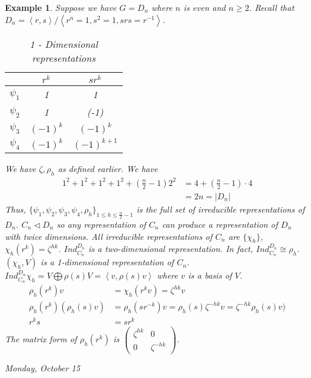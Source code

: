 \documentclass[letterpaper, leqno, 12pt]{article}
\newcommand{\fin}{\qquad \quad \hfill \framebox[1.75mm][l]{\,}}
\providecommand{\ip}[1]{\left\langle #1 \right\rangle}
\newcommand{\tmatrix}[4]{\left(  \begin{array}{cc}
#1 & #2 \\ 
#3 & #4
\end{array} \right) }
\theoremstyle{stdthm}
\theoremstyle{stddef}
\newtheorem{eg}[thm]{Example} %
\theoremstyle{stdnonum}
\theoremstyle{stdqands}
\theoremstyle{stdbold}
\begin{document}
\begin{eg}
Suppose we have $G = D_n$ where $n$ is even and $n\geq 2$. Recall that $D_n = \ip{r,s}/\ip{r^n = 1, s^2 = 1, srs = r^{-1}}$. 

\begin{table}[htdp]
\caption{1 - Dimensional representations}
\begin{center}
\begin{tabular}{|c|c|c|}
 & $r^k$ & $sr^k$ \\ 
 \hline
 $\psi_1$ & 1 & 1 \\
 $\psi_2$ & 1 & (-1) \\
 $\psi_3$ & $(-1)^k$ & $(-1)^k$\\
 $ \psi_4 $ & $(-1)^k$ & $(-1)^{k+1}$ 
\end{tabular}
\end{center}
\label{1 Dimensional representations}
\end{table}
We have $\zeta, \rho_h$ as defined earlier. We have
\begin{align*}
1^2 + 1^2 + 1^2 + 1^2 +(\frac{n}{2} - 1) 2^2 &= 4 + (\frac{n}{2} - 1) \cdot 4\\
&= 2n = |D_n|
\end{align*}
Thus, $\{\psi_1, \psi_2,\psi_3,\psi_4, \rho_h\}_{1\leq h \leq \frac{n}{2} - 1}$ is the full set of irreducible representations of $D_n$.  $C_n \lhd D_n$  so any representation of $C_n$ can produce a representation of $D_n$  with twice dimensions. All irreducible representations of $C_n$ are $\{\chi_h\}$, $\chi_h(r^k) = \zeta^{hk}$. $Ind_{C_n}^{D_n}$ is a two-dimensional representation. In fact, $Ind_{C_n}^{D_n} \cong \rho_h$. \\

\noindent $(\chi_h,V)$ is a 1-dimensional representation of $C_n$. $Ind_{C_n}^{D_n} \chi_h = V \bigoplus \rho(s) V = \ip{v, \rho(s) v}$  where $v$ is a basis of $V$.
\begin{align*}
\rho_h(r^k) v &= \chi_h (r^k v) = \zeta^{hk} v\\
\rho_h(r^k) (\rho_h(s) v) &= \rho_h(sr^{-k}) v = \rho_h(s) \zeta^{-hk}v = \zeta^{-hk} \rho_h(s) v)\\
r^k s &= sr^k
\end{align*} 
The matrix form of $\rho_h(r^k)$ is $\tmatrix{\zeta^{hk}} {0} {0}{\zeta^{-hk}}$. 
\end{eg}

\begin{center}
\emph{Monday, October 15}
\end{center}
\end{document}
